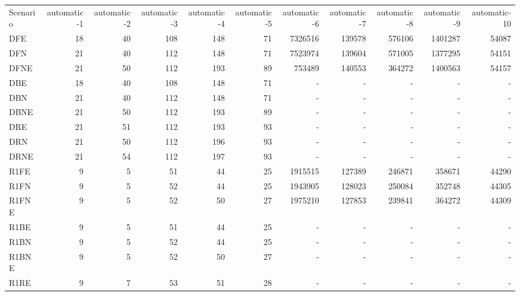 \documentclass [11pt]{article}
\begin{document}
\begin{sidewaystable}
\small
  \everyrow{\hline}
  \begin{tabu} {| l |r | r |r |r |r |r |r |r |r |r |}
  Scenario    &automatic-1   & automatic-2    &automatic-3    &automatic-4    & automatic-5  & automatic-6    & automatic-7    &  automatic-8   & automatic-9   & automatic-10 \\
  DFE    & 18   & 40    & 108    & 148   &  71   &  7326516   & 139578    & 576106    &  1401287   & 54087    \\ 
  DFN    & 21   & 40    & 112    & 148   &  71   &  7523974   & 139604    & 571005    &  1377295   & 54151   \\ 
  DFNE   & 21   & 50    & 112    & 193   &  89   &   753489   & 140553    & 364272    &  1400563   & 54157    \\ 
  DBE    & 18   & 40    & 108    & 148   &  71   &  -   &   -    &   -    &    -   &   -   \\ 
  DBN    & 21   & 40    & 112    & 148   &  71   &  -   &   -    &   -    &    -   &   -   \\ 
  DBNE    & 21  & 50    & 112    & 193   &  89   &  -   &   -    &   -    &    -   &   -    \\ 
  DRE    & 21   & 51    & 112    & 193   &  93   &  -   &   -    &   -    &    -   &   -   \\ 
  DRN    & 21   & 50    & 112    & 196   &  93   &  -   &   -    &   -    &    -   &   -   \\ 
  DRNE   & 21   & 54    & 112    & 197   &  93   &  -   &   -    &   -    &    -   &   -    \\ 
  R1FE   & 9   & 5   & 51   & 44 &  25  &   1915515  & 127389   & 246871   &  358671  & 44290 \\ 
  R1FN    & 9  & 5   & 52   & 44 &  25  &   1943905  & 128023   & 250084   &  352748  & 44305   \\ 
  R1FNE    &9   &5    &52    &50  & 27   & 1975210   &127853    &239841    & 364272   &44309    \\ 
  R1BE    & 9  & 5   & 51   & 44 &  25  &  -   &   -    &   -    &    -   &   -    \\ 
  R1BN    & 9  & 5   & 52   & 44 &  25  &  -   &   -    &   -    &    -   &   -    \\ 
  R1BNE    &9   &5    &52    &50  & 27   &  -   &   -    &   -    &    -   &   -    \\ 
  R1RE    & 9  & 7   & 53   & 51 &  28  &  -   &   -    &   -    &    -   &   -    \\ 

\end{tabu}
\end{sidewaystable}
\end{document}
